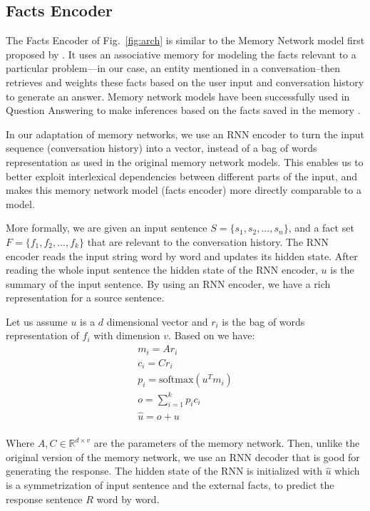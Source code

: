 \documentclass[letterpaper]{article}
\begin{document}
\subsection{Facts Encoder}

The Facts Encoder of Fig.~\ref{fig:arch} is similar to the Memory Network model first proposed by \cite{weston2014,sukhbaatar2015}.
It uses an associative memory for modeling the facts 
relevant to a particular problem---in our case, an entity mentioned in a conversation--then retrieves and weights these facts based on the user input and conversation history to generate an answer. 
Memory network models 
have been successfully used 
in Question Answering to make inferences based on the facts saved in the memory \cite{weston2015}.

In our adaptation of memory networks, we use an RNN encoder to turn the input sequence (conversation history) into a vector, instead of a bag of words representation as used in the original memory network models.  
This enables us to better exploit interlexical dependencies between different parts of the input, and makes this memory network model (facts encoder) more directly comparable to a \sts model.

More formally, we are given an input sentence $S=\{s_{1}, s_{2}, ..., s_{n}\}$, and a fact set $F=\{f_1,f_2,...,f_k\}$ that are relevant to the conversation history. 
The RNN encoder reads the input string word by word and updates its hidden state. 
After reading the whole input sentence the hidden state of the RNN encoder, $u$ is the summary of the input sentence. 
By using an RNN encoder, we have a rich representation for a source sentence.

Let us assume $u$ is a $d$ dimensional vector and $r_i$ is the bag of words representation of $f_i$ with dimension $v$. Based on \cite{sukhbaatar2015} we have:
\begin{align}
m_i=A r_i\\
c_i=C r_i\\
p_i=\textrm{softmax}(u^T m_i)\\
o=\sum _{i=1}^{k} p_i c_i\\
\hat u = o+u \label{eq:sum}
\end{align}\\[-0.5cm]
Where $A,C \in \mathbb{R}^{d\times v}$ are the parameters of the memory network. Then, unlike the original version of the memory network, we use an RNN decoder that is good for generating the response. The hidden state of the RNN is initialized with $\hat u$ which is a symmetrization of input sentence and the external facts, to predict the response sentence $R$ word by word.
\end{document}
